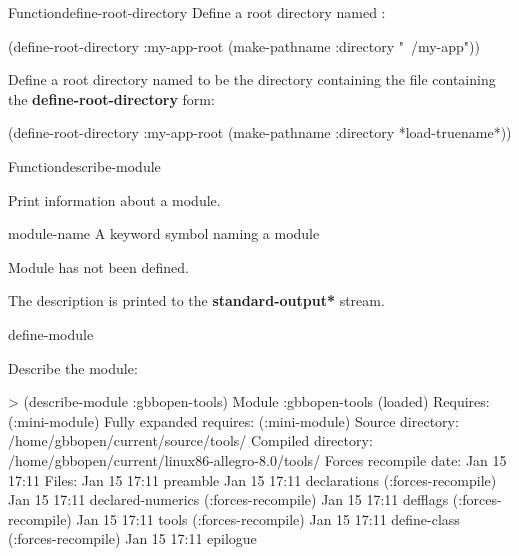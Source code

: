\documentclass[10pt,twoside,english,pdftex]{article}
\begin{document}
\begin{functiondoc}{Function}{define-root-directory}{  }
\fnexamples Define a root directory named :
\begin{example}
  (define-root-directory :my-app-root 
    (make-pathname :directory "~/my-app"))
\end{example}

Define a root directory named  to be the directory
containing the file containing the \textbf{define-root-directory} form:
\begin{example}
  (define-root-directory :my-app-root 
    (make-pathname :directory *load-truename*))
\end{example}

\end{functiondoc}


\begin{functiondoc}{Function}{describe-module}{}
%
%
%

\fnsyntax 

\fnpurpose Print information about a module.

\fnpackage {}

\fnmodule {}

\fnargs
\begin{args}{module-name}
 A keyword symbol naming a module 
\end{args}

\fnerrors
Module  has not been defined.

\fndescription
{}%
The description is printed to the {\bf *standard-output*} stream.

\begin{alsos}{define-module}
\end{alsos}

\fnexample
Describe the  module:
\begin{example}
> (describe-module :gbbopen-tools)
Module :gbbopen-tools (loaded)
  Requires: (:mini-module)
  Fully expanded requires: (:mini-module)
  Source directory: /home/gbbopen/current/source/tools/
  Compiled directory: /home/gbbopen/current/linux86-allegro-8.0/tools/
  Forces recompile date: Jan 15 17:11
  Files: Jan 15 17:11 preamble 
         Jan 15 17:11 declarations (:forces-recompile)
         Jan 15 17:11 declared-numerics (:forces-recompile)
         Jan 15 17:11 defflags (:forces-recompile)
         Jan 15 17:11 tools (:forces-recompile)
         Jan 15 17:11 define-class (:forces-recompile)
         Jan 15 17:11 epilogue 
\end{example} 

\end{functiondoc}
\end{document}
